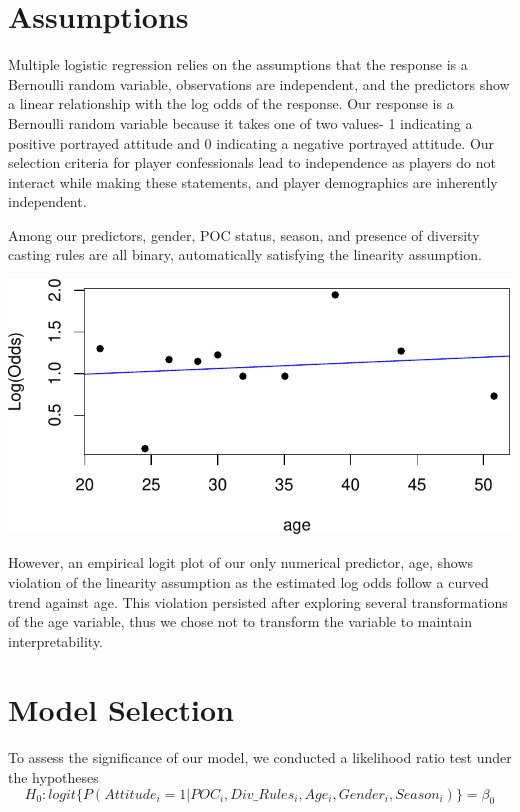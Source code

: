 \documentclass[
  letterpaper,
  DIV=11,
  numbers=noendperiod,
  oneside]{scrartcl}
\begin{document}
\hypertarget{assumptions}{%
\section{Assumptions}\label{assumptions}}

Multiple logistic regression relies on the assumptions that the response
is a Bernoulli random variable, observations are independent, and the
predictors show a linear relationship with the log odds of the response.
Our response is a Bernoulli random variable because it takes one of two
values- 1 indicating a positive portrayed attitude and 0 indicating a
negative portrayed attitude. Our selection criteria for player
confessionals lead to independence as players do not interact while
making these statements, and player demographics are inherently
independent.

Among our predictors, gender, POC status, season, and presence of
diversity casting rules are all binary, automatically satisfying the
linearity assumption.

\includegraphics{Survivor_files/figure-pdf/label-3-1.pdf}

However, an empirical logit plot of our only numerical predictor, age,
shows violation of the linearity assumption as the estimated log odds
follow a curved trend against age. This violation persisted after
exploring several transformations of the age variable, thus we chose not
to transform the variable to maintain interpretability.

\hypertarget{model-selection}{%
\section{Model Selection}\label{model-selection}}

To assess the significance of our model, we conducted a likelihood ratio
test under the hypotheses
\[H_0: logit \{P(Attitude_i=1|POC_i,Div\_Rules_i,Age_i,Gender_i,Season_i)\} = \beta_0\]
\end{document}
